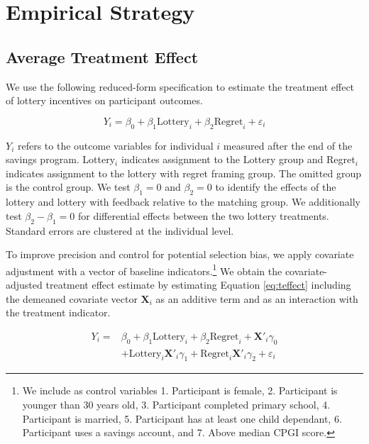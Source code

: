 \documentclass[11pt]{article}
\begin{document}
\section{Empirical Strategy} \label{sec:est}

	\subsection{Average Treatment Effect}

		We use the following reduced-form specification to estimate the treatment effect of lottery incentives on participant outcomes.

		\begin{equation} \label{eq:teffect}
			Y_{i} = \beta_{0} + \beta_{1}\text{Lottery}_{i} + \beta_{2}\text{Regret}_{i} + \varepsilon_{i}
		\end{equation}

		$Y_{i}$ refers to the outcome variables for individual $i$ measured after the end of the savings program. Lottery$_i$ indicates assignment to the Lottery group and Regret$_i$ indicates assignment to the lottery with regret framing group. The omitted group is the control group. We test $\beta_{1} = 0$ and $\beta_{2} = 0$ to identify the effects of the lottery and lottery with feedback relative to the matching group. We additionally test $\beta_{2} - \beta_{1} = 0$ for differential effects between the two lottery treatments. Standard errors are clustered at the individual level.

		To improve precision and control for potential selection bias, we apply covariate adjustment with a vector of baseline indicators.\footnote{We include as control variables 1. Participant is female, 2. Participant is younger than 30 years old, 3. Participant completed primary school, 4. Participant is married, 5. Participant has at least one child dependant, 6. Participant uses a savings account, and 7. Above median CPGI score.} We obtain the covariate-adjusted treatment effect estimate by estimating Equation \ref{eq:teffect} including the demeaned covariate vector $\mathbf{X}_{i}$ as an additive term and as an interaction with the treatment indicator.

		\begin{equation} \begin{split} \label{eq:controls}
			Y_{i} = & \beta_{0} + \beta_{1}\text{Lottery}_{i} + \beta_{2}\text{Regret}_{i} + \mathbf{X}'_i \gamma_{0} \\
					& + \text{Lottery}_{i} \mathbf{X}'_i \gamma_{1} + \text{Regret}_{i} \mathbf{X}'_i \gamma_{2} + \varepsilon_{i}
		\end{split} \end{equation}
\end{document}
